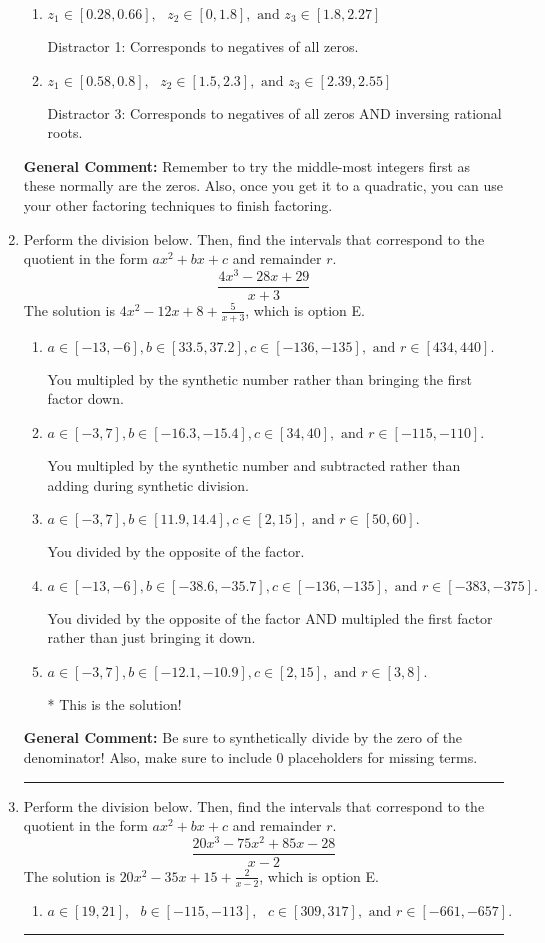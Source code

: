 \documentclass{extbook}[14pt]
\newcommand{\litem}[1]{\item #1

\rule{\textwidth}{0.4pt}}
\begin{document}
\begin{enumerate}
{\begin{enumerate}[label=\Alph*.]
 Distractor 4: Corresponds to moving factors from one rational to another.
\item \( z_1 \in [0.28, 0.66], \text{   }  z_2 \in [0, 1.8], \text{   and   } z_3 \in [1.8, 2.27] \)

 Distractor 1: Corresponds to negatives of all zeros.
\item \( z_1 \in [0.58, 0.8], \text{   }  z_2 \in [1.5, 2.3], \text{   and   } z_3 \in [2.39, 2.55] \)

 Distractor 3: Corresponds to negatives of all zeros AND inversing rational roots.
\end{enumerate}

\textbf{General Comment:} Remember to try the middle-most integers first as these normally are the zeros. Also, once you get it to a quadratic, you can use your other factoring techniques to finish factoring.
}
\litem{
Perform the division below. Then, find the intervals that correspond to the quotient in the form $ax^2+bx+c$ and remainder $r$.
\[ \frac{4x^{3} -28 x + 29}{x + 3} \]The solution is \( 4x^{2} -12 x + 8 + \frac{5}{x + 3} \), which is option E.\begin{enumerate}[label=\Alph*.]
\item \( a \in [-13, -6], b \in [33.5, 37.2], c \in [-136, -135], \text{ and } r \in [434, 440]. \)

 You multipled by the synthetic number rather than bringing the first factor down.
\item \( a \in [-3, 7], b \in [-16.3, -15.4], c \in [34, 40], \text{ and } r \in [-115, -110]. \)

 You multipled by the synthetic number and subtracted rather than adding during synthetic division.
\item \( a \in [-3, 7], b \in [11.9, 14.4], c \in [2, 15], \text{ and } r \in [50, 60]. \)

 You divided by the opposite of the factor.
\item \( a \in [-13, -6], b \in [-38.6, -35.7], c \in [-136, -135], \text{ and } r \in [-383, -375]. \)

 You divided by the opposite of the factor AND multipled the first factor rather than just bringing it down.
\item \( a \in [-3, 7], b \in [-12.1, -10.9], c \in [2, 15], \text{ and } r \in [3, 8]. \)

* This is the solution!
\end{enumerate}

\textbf{General Comment:} Be sure to synthetically divide by the zero of the denominator! Also, make sure to include 0 placeholders for missing terms.
}
\litem{
Perform the division below. Then, find the intervals that correspond to the quotient in the form $ax^2+bx+c$ and remainder $r$.
\[ \frac{20x^{3} -75 x^{2} +85 x -28}{x -2} \]The solution is \( 20x^{2} -35 x + 15 + \frac{2}{x -2} \), which is option E.\begin{enumerate}[label=\Alph*.]
\item \( a \in [19, 21], \text{   } b \in [-115, -113], \text{   } c \in [309, 317], \text{   and   } r \in [-661, -657]. \)


\end{enumerate}}
\end{enumerate}
\end{document}
